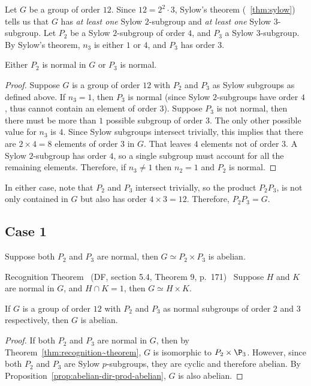 Let $G$ be a group of order $12$.
Since $12 = 2^2 \cdot 3$, Sylow's theorem (~\ref{thm:sylow})
tells us that $G$ has \emph{at least one} Sylow $2$-subgroup
and \emph{at least one} Sylow $3$-subgroup.
Let $P_2$ be a Sylow $2$-subgroup of order $4$, and $P_3$ a Sylow $3$-subgroup.
By Sylow's theorem, $n_3$ is either $1$ or $4$, and $P_3$ has order $3$.

\begin{proposition}
  Either $P_2$ is normal in $G$ or $P_3$ is normal.

  \begin{proof}
    Suppose $G$ is a group of order $12$ with $P_2$ and $P_3$
    as Sylow subgroups as defined above.
    If $n_3 = 1$, then $P_3$ is normal (since Sylow $2$-subgroups
    have order $4$, thus cannot contain an element of order $3$).
    Suppose $P_3$ is not normal, then there must be more than
    $1$ possible subgroup of order $3$.
    The only other possible value for $n_3$ is $4$.
    Since Sylow subgroups intersect trivially,
    this implies that there are $2 \times 4 = 8$ elements of order $3$ in $G$.
    That leaves $4$ elements not of order $3$.
    A Sylow $2$-subgroup has order $4$, so a single subgroup
    must account for all the remaining elements. Therefore,
    if $n_3 \neq 1$ then $n_2 = 1$ and $P_2$ is normal.
  \end{proof}

  In either case, note that $P_2$ and $P_3$ intersect trivially,
  so the product $P_2P_3$, is not only contained in $G$
  but also has order $4 \times 3 = 12$.
  Therefore, $P_2P_3 = G$.
\end{proposition}

\subsection*{Case 1} Suppose both $P_2$ and $P_3$ are normal,
then $G \simeq P_2 \times P_3$ is abelian.

\begin{theorem}{Recognition Theorem}~\label{thm:recognition~theorem}
  (DF, section 5.4, Theorem 9, p.~171)~\cite{DummitFoote}
  Suppose $H$ and $K$ are normal in $G$, and $H \cap K = 1$,
  then $G \simeq H \times K$.
\end{theorem}

\begin{corollary}
  If $G$ is a group of order $12$ with $P_2$ and $P_3$ as normal subgroups
  of order $2$ and $3$ respectively, then $G$ is abelian.
  
  \begin{proof}
    If both $P_2$ and $P_3$ are normal in $G$,
    then by Theorem~\ref{thm:recognition~theorem}, $G$ is isomorphic to $P_2 \times \P_3$.
    However, since both $P_2$ and $P_3$ are Sylow $p$-subgroups, they are cyclic
    and therefore abelian.
    By Proposition~\ref{prop:abelian-dir-prod-abelian}, $G$ is also abelian.
  \end{proof}
\end{corollary}

